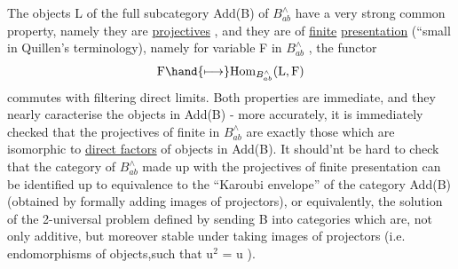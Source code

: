 The objects  L of the full subcategory  Add(B) of $B^{\wedge}_{ab}$ have a very
strong common property,  namely they are \uline{projectives} ,  and they are
of \uline{finite} \uline{presentation}  (``small in Quillen's terminology),
namely for variable F in $B^{\wedge}_{ab}$ ,  the functor
\[ \text{F} \hand{\longmapsto} \text{Hom}_{B^{\wedge}_{ab}} (\text{L},\text{F}) \]
commutes with filtering direct limits.  Both properties are immediate,
and they nearly caracterise the objects in Add(B) -  more accurately,
it is immediately checked that the projectives of finite  in $B^{\wedge}_{ab}$
are exactly those which are isomorphic to \uline{direct factors} of objects in
Add(B).  It should'nt be hard to check that the category of  $B^{\wedge}_{ab}$
made up with the projectives  of finite presentation can be identified
up to equivalence to the ``Karoubi envelope'' of the category Add(B)
(obtained by formally adding images of projectors),  or equivalently,
 the solution of the 2-universal problem defined by sending B into
categories which are,  not only additive,  but moreover stable under
taking images of projectors (i.e. endomorphisms  of objects,such that
u$^{2}$ = u ).

